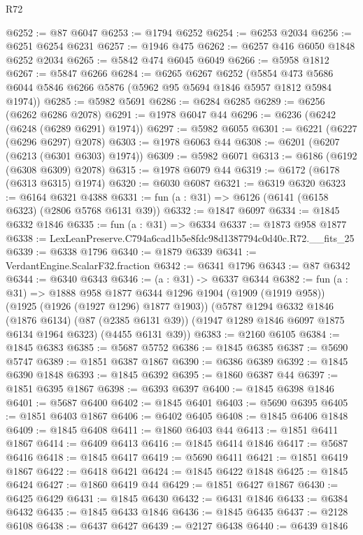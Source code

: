 \begin{lexlean}{R72}
\begin{coremodule}
@6252 := @87 @6047
@6253 := @1794 @6252
@6254 := @6253 @2034
@6256 := @6251 @6254 @6231
@6257 := @1946 @475
@6262 := @6257 @416 @6050 @1848 @6252 @2034
@6265 := @5842 @474 @6045 @6049
@6266 := @5958 @1812
@6267 := @5847 @6266
@6284 := @6265
    @6267
    @6252
    (@5854 @473 @5686 @6044 @5846 @6266 @5876 (@5962 @95 @5694 @1846 @5957 @1812 @5984 @1974))
@6285 := @5982 @5691
@6286 := @6284 @6285
@6289 := @6256 (@6262 @6286 @2078)
@6291 := @1978 @6047 @44
@6296 := @6236 (@6242 (@6248 (@6289 @6291) @1974))
@6297 := @5982 @6055
@6301 := @6221 (@6227 (@6296 @6297) @2078)
@6303 := @1978 @6063 @44
@6308 := @6201 (@6207 (@6213 (@6301 @6303) @1974))
@6309 := @5982 @6071
@6313 := @6186 (@6192 (@6308 @6309) @2078)
@6315 := @1978 @6079 @44
@6319 := @6172 (@6178 (@6313 @6315) @1974)
@6320 := @6030 @6087
@6321 := @6319 @6320
@6323 := @6164 @6321 @4388
@6331 := fun (a : @31) => @6126 (@6141 (@6158 @6323) (@2806 @5768 @6131 @39))
@6332 := @1847 @6097
@6334 := @1845 @6332 @1846
@6335 := fun (a : @31) => @6334
@6337 := @1873 @958 @1877
@6338 := LexLeanPreserve.C794a6cad1b5e8fdc98d1387794c0d40c.R72.__fits_25
@6339 := @6338 @1796
@6340 := @1879 @6339
@6341 := VerdantEngine.ScalarF32.fraction
@6342 := @6341 @1796
@6343 := @87 @6342
@6344 := @6340 @6343
@6346 := (a : @31) -> @6337 @6344
@6382 := fun (a : @31) =>
  @1888
    @958
    @1877
    @6344
    @1296
    @1904
    (@1909 (@1919 @958))
    (@1925 (@1926 (@1927 @1296) @1877 @1903))
    (@5787
      @1294
      @6332
      @1846
      (@1876 @6134)
      (@87 (@2385 @6131 @39))
      (@1947 @1289 @1846 @6097 @1875 @6134 @1964 @6323)
      (@4455 @6131 @39))
@6383 := @2160 @6105
@6384 := @1845 @6383
@6385 := @5687 @5752
@6386 := @1845 @6385
@6387 := @5690 @5747
@6389 := @1851 @6387 @1867
@6390 := @6386 @6389
@6392 := @1845 @6390 @1848
@6393 := @1845 @6392
@6395 := @1860 @6387 @44
@6397 := @1851 @6395 @1867
@6398 := @6393 @6397
@6400 := @1845 @6398 @1846
@6401 := @5687 @6400
@6402 := @1845 @6401
@6403 := @5690 @6395
@6405 := @1851 @6403 @1867
@6406 := @6402 @6405
@6408 := @1845 @6406 @1848
@6409 := @1845 @6408
@6411 := @1860 @6403 @44
@6413 := @1851 @6411 @1867
@6414 := @6409 @6413
@6416 := @1845 @6414 @1846
@6417 := @5687 @6416
@6418 := @1845 @6417
@6419 := @5690 @6411
@6421 := @1851 @6419 @1867
@6422 := @6418 @6421
@6424 := @1845 @6422 @1848
@6425 := @1845 @6424
@6427 := @1860 @6419 @44
@6429 := @1851 @6427 @1867
@6430 := @6425 @6429
@6431 := @1845 @6430
@6432 := @6431 @1846
@6433 := @6384 @6432
@6435 := @1845 @6433 @1846
@6436 := @1845 @6435
@6437 := @2128 @6108
@6438 := @6437 @6427
@6439 := @2127 @6438
@6440 := @6439 @1846

\end{coremodule}
\end{lexlean}

